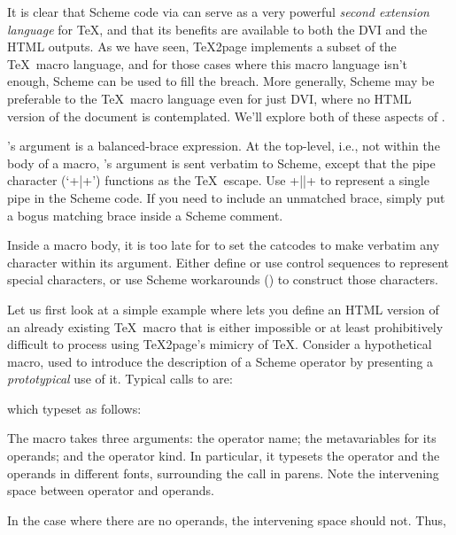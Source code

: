 {{{{{{{{{{{{{{It is clear that Scheme code via \p{\eval} can serve as
a very powerful {\em second extension language} for
\TeX, and that its benefits are available to both the
DVI and the HTML outputs.  As we have seen, \TeX2page
implements a subset of the \TeX\ macro language, and for
those cases where this macro language isn’t enough,
Scheme can be used to fill the breach.  More generally,
Scheme may be preferable to the \TeX\ macro language even
for just DVI, where no HTML version of the document is
contemplated.  We’ll explore both of these
aspects of \p{\eval}.

\p{\eval}’s argument is a balanced-brace
expression.  At the top-level, i.e., not within the body of a macro,
\p{\eval}’s argument is sent verbatim to Scheme, except that the pipe character
(‘\p+|+’) functions as the \TeX\ escape.  Use \p+||+ to represent a single
pipe in the Scheme code.  If you need to include an unmatched brace, simply
put a bogus matching brace inside a Scheme comment.

Inside a macro body, it is too late for \p{\eval} to set the catcodes
to make verbatim any character within its argument.  Either define or
use control sequences to represent special characters, or use Scheme
workarounds () to construct those characters.

Let us first look at a simple example where
\p{\eval} lets you define an HTML version of an already
existing \TeX\ macro that is either impossible or at
least prohibitively difficult  to process using
\TeX2page’s  mimicry of \TeX.  Consider a hypothetical
\p{\proto} macro, used to introduce the description of
a Scheme operator by presenting a {\em prototypical}
use of it.
Typical calls to \p{\proto} are:


\n which typeset as follows:

\quote


\endquote

\n The macro \p{\proto} takes three arguments: the
operator name; the metavariables for its operands;
and the operator kind.  In particular, it typesets
the operator and the operands in different fonts,
surrounding the call in parens.  Note the
intervening space between operator and operands.

In the case where there are no operands, the intervening
space should not.  Thus,

}}}}}}}}}}}}}}
